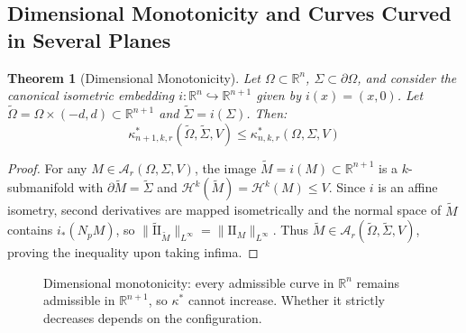 \documentclass[11pt,reqno]{amsart}
\newtheorem{theorem}{Theorem}[section]
\theoremstyle{definition}
\providecommand{\R}{\mathbb{R}}
\providecommand{\II}{\mathrm{I\!I}}
\providecommand{\Hsn}{\mathcal{H}}
\numberwithin{equation}{section}
\providecommand{\II}{\mathrm{II}}
\providecommand{\R}{\mathbb{R}}
\providecommand{\Hsn}{\mathcal{H}}
\begin{document}
\subsection{Dimensional Monotonicity and Curves Curved in Several Planes}

\begin{theorem}[Dimensional Monotonicity]
\label{thm:monotonicity}
Let $\Omega \subset \R^n$, $\Sigma \subset \partial\Omega$, and consider the canonical isometric embedding $i: \R^n \hookrightarrow \R^{n+1}$ given by $i(x) = (x, 0)$. Let $\tilde{\Omega} = \Omega \times (-d, d) \subset \R^{n+1}$ and $\tilde{\Sigma} = i(\Sigma)$. Then:
\begin{equation}
\kappa^*_{n+1, k, r}(\tilde{\Omega}, \tilde{\Sigma}, V) \leq \kappa^*_{n, k, r}(\Omega, \Sigma, V)
\end{equation}
\end{theorem}

\begin{proof}
For any $M \in \mathcal{A}_r(\Omega, \Sigma, V)$, the image $\tilde{M} = i(M) \subset \R^{n+1}$ is a $k$-submanifold with $\partial\tilde{M} = \tilde{\Sigma}$ and $\Hsn^k(\tilde{M}) = \Hsn^k(M) \le V$. Since $i$ is an affine isometry, second derivatives are mapped isometrically and the normal space of $\tilde M$ contains $i_*(N_pM)$, so $\|\tilde{\II}_{\tilde{M}}\|_{L^\infty} = \|\II_M\|_{L^\infty}$. Thus $\tilde{M} \in \mathcal{A}_r(\tilde{\Omega}, \tilde{\Sigma}, V)$, proving the inequality upon taking infima.
\end{proof}

\begin{figure}[htbp]
\centering
{}
\caption{Dimensional monotonicity: every admissible curve in $\R^n$ remains admissible in $\R^{n+1}$, so $\kappa^*$ cannot increase. Whether it strictly decreases depends on the configuration.}
\label{fig:monotonicity}
\end{figure}
\end{document}
